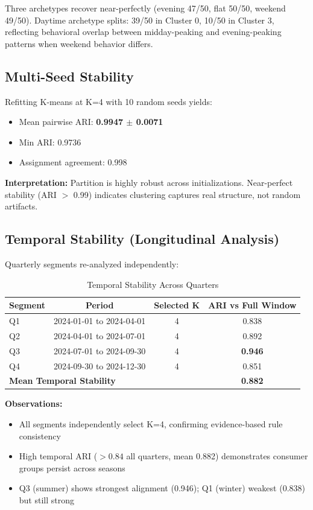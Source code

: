 Three archetypes recover near-perfectly (evening 47/50, flat 50/50, weekend 49/50). Daytime archetype splits: 39/50 in Cluster 0, 10/50 in Cluster 3, reflecting behavioral overlap between midday-peaking and evening-peaking patterns when weekend behavior differs.

\subsection{Multi-Seed Stability}

Refitting K-means at K=4 with 10 random seeds yields:
\begin{itemize}
    \item Mean pairwise ARI: \textbf{0.9947 $\pm$ 0.0071}
    \item Min ARI: 0.9736
    \item Assignment agreement: 0.998
\end{itemize}

\textbf{Interpretation:} Partition is highly robust across initializations. Near-perfect stability (ARI $>$ 0.99) indicates clustering captures real structure, not random artifacts.

\subsection{Temporal Stability (Longitudinal Analysis)}

Quarterly segments re-analyzed independently:

\begin{table}[h]
\centering
\caption{Temporal Stability Across Quarters}
\label{tab:temporal_stability}
\begin{tabular}{@{}lccc@{}}
\toprule
Segment & Period & Selected K & ARI vs Full Window \\
\midrule
Q1 & 2024-01-01 to 2024-04-01 & 4 & 0.838 \\
Q2 & 2024-04-01 to 2024-07-01 & 4 & 0.892 \\
Q3 & 2024-07-01 to 2024-09-30 & 4 & \textbf{0.946} \\
Q4 & 2024-09-30 to 2024-12-30 & 4 & 0.851 \\
\midrule
\multicolumn{3}{l}{\textbf{Mean Temporal Stability}} & \textbf{0.882} \\
\bottomrule
\end{tabular}
\end{table}

\textbf{Observations:}
\begin{itemize}
    \item All segments independently select K=4, confirming evidence-based rule consistency
    \item High temporal ARI ($>0.84$ all quarters, mean 0.882) demonstrates consumer groups persist across seasons
    \item Q3 (summer) shows strongest alignment (0.946); Q1 (winter) weakest (0.838) but still strong
\end{itemize}

